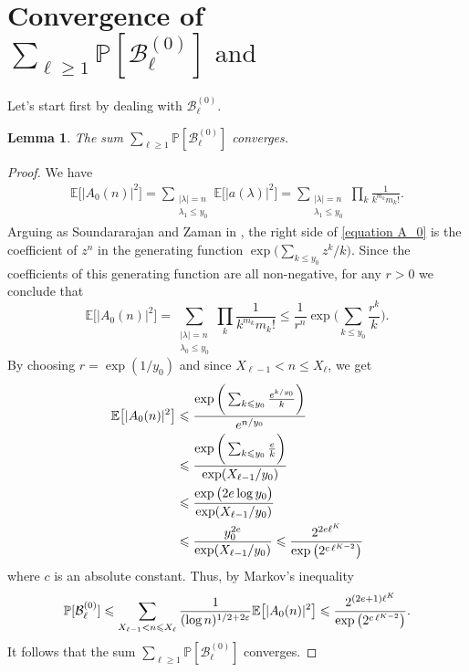 \documentclass{article}
\newtheorem{lemma}[theorem]{Lemma}
\begin{document}
\section{Convergence of \texorpdfstring{$\sum_{\ell \geqslant 1} \mathbb{P}[\mathcal{B}_{\ell}^{(0)}] \text{ and }$} \texorpdfstring{$\sum_{\ell \geqslant 1} \mathbb{P}[\mathcal{B}_{\ell}^{(3)}]$}.}
\noindent Let's start first by dealing with  $\mathcal{B}_{\ell}^{(0)}$.
\begin{lemma}\label{lemma_pb0}
The sum $ \sum_{\ell \geqslant 1} \mathbb{P}[\mathcal{B}_{\ell}^{(0)}]$ converges.
\end{lemma}
\begin{proof}[Proof]
We have 
\begin{equation}\label{equation A_0}
   \begin{aligned}
\mathbb{E}\big[ |A_0(n)|^2\big]  = \sum_{\substack{ |\lambda|=n \\ \lambda_1 \leqslant y_0}} \mathbb{E}\big[|a(\lambda)|^2\big]
 =  \sum_{\substack{ |\lambda|=n \\ \lambda_1 \leqslant y_0}}\prod_k \frac{1}{k^{m_k}m_k!}.
\end{aligned} 
\end{equation}
Arguing as Soundararajan and Zaman in \cite{model_zaman}, the right side of \eqref{equation A_0} is the coefficient of $z^n$ in the generating function $\exp\big(\sum_{k\leqslant y_0}z^k/k \big)$. Since the coefficients of this generating function are all non-negative, for any $r > 0$ we conclude that 
\begin{equation}\label{equaltion_with_r}
    \mathbb{E}\big[ |A_0(n)|^2\big]  = \sum_{\substack{ |\lambda|=n \\ \lambda_0 \leqslant y_0}} \prod_k \frac{1}{k^{m_k}m_k!} \leqslant \frac{1}{r^n}\exp\bigg(\sum_{k\leqslant y_0}\frac{r^{k}}{k} \bigg).
\end{equation}
By choosing $r=\exp(1/y_0)$ and since $X_{\ell-1}<n\leqslant X_{\ell}$, we get
\begin{align*}
    \mathbb{E}\big[ |A_0(n)|^2\big]  & \leqslant \frac{\exp\bigg(\sum_{k \leqslant y_0} \frac{{\rm e}^{k/y_0}}{k}\bigg)}{{\rm e}^{n/y_0}}
    \\ & \leqslant \frac{\exp\bigg(\sum_{k \leqslant y_0} \frac{{\rm e}}{k}\bigg)}{\exp(X_{\ell-1}/y_0)}
    \\ & \leqslant \frac{\exp\big(2{\rm e} \log y_0\big)}{\exp(X_{\ell-1}/y_0)}
    \\ & \leqslant \frac{y_0^{2{\rm e}}}{\exp(X_{\ell-1}/y_0)} \leqslant \frac{2^{2{\rm e}\ell^K}}{\exp\big(2^{c\, \ell^{K-2}}\big)}
\end{align*}
where $c$ is an absolute constant. Thus, by Markov's inequality
$$
\mathbb{P}[\mathcal{B}_{\ell}^{(0)}]\leqslant \sum_{X_{\ell-1}<n\leqslant X_{\ell}} \frac{1}{(\log n)^{1/2+2\varepsilon}} \mathbb{E}\big[ |A_0(n)|^2\big] \leqslant \frac{2^{(2{\rm e}+1)\ell^K}}{\exp\big(2^{c\,\ell^{K-2}}\big)}.
$$
It follows that the sum $ \sum_{\ell \geqslant 1} \mathbb{P}[\mathcal{B}_{\ell}^{(0)}]$ converges.
\end{proof}
\end{document}

